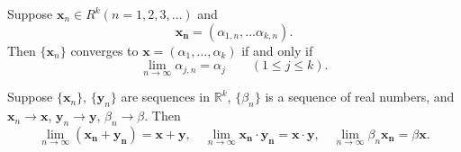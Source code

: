 \begin{thm} 
    \label{thm:3.4}
    \begin{asparaenum}[(a)]
    \item Suppose $\mathbf{x}_n \in R^k (n = 1,2,3,\dots)$ and
    \begin{equation*}
        \mathbf{x_n} = (
            \alpha_{1,n},\dots
            \alpha_{k,n}
        ).
    \end{equation*}
    Then $\{\mathbf{x}_n\}$ converges to $\mathbf{x} = (\alpha_1, \dots, \alpha_k)$ if and only if
    \begin{equation}
        \lim_{n \to \infty} \alpha_{j,n} = \alpha_j \qquad (1\leq j\leq k).
    \end{equation}

    \item Suppose $\{\mathbf{x}_n\}$, $\{\mathbf{y}_n\}$ are sequences in $\mathbb{R}^k$, $\{\beta_n\}$ is a sequence of real numbers, and 
    $\mathbf{x}_n \rightarrow \mathbf{x}$,
    $\mathbf{y}_n \rightarrow \mathbf{y}$,
    $\beta_n \rightarrow \beta$. Then
    \begin{equation*}
        \lim_{n \to \infty} (\mathbf{x_n} + \mathbf{y_n}) = \mathbf{x} + \mathbf{y}, \quad
        \lim_{n \to \infty} \mathbf{x_n} \cdot \mathbf{y_n} = \mathbf{x} \cdot \mathbf{y}, \quad
        \lim_{n \to \infty} \beta_n \mathbf{x_n} = \beta \mathbf{x}.
    \end{equation*}
    \end{asparaenum}
\end{thm}
